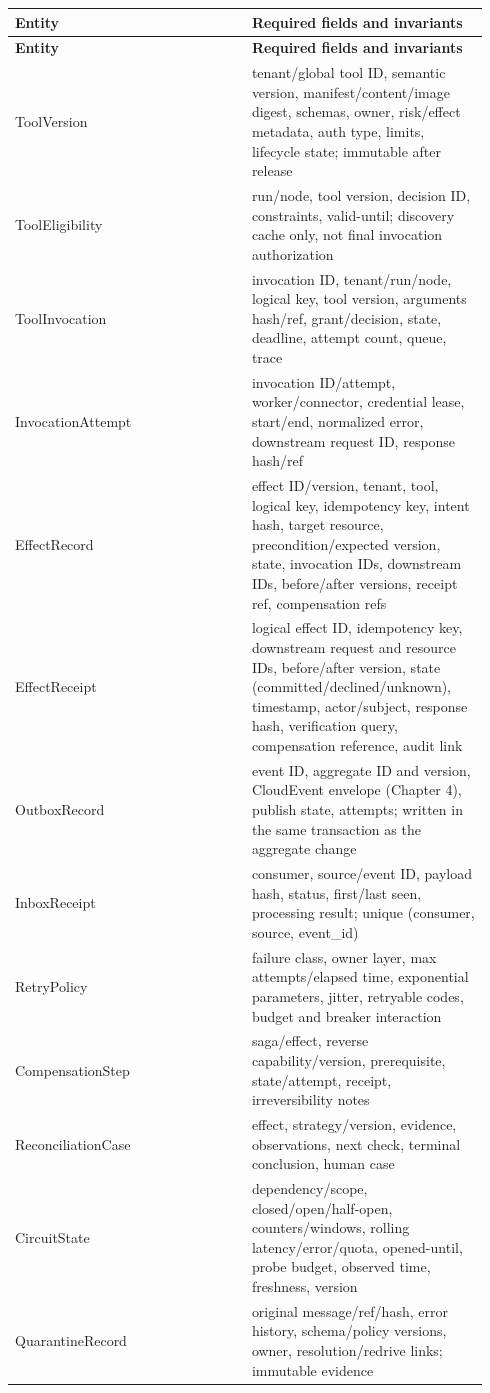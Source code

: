\BookTableStart
\small
\begin{longtable}{@{}Y{0.4700\linewidth}Y{0.4700\linewidth}@{}}
\color{white}\bfseries \textbf{Entity} & \color{white}\bfseries \textbf{Required fields and invariants} \\
\endfirsthead
{}
\color{white}\bfseries \textbf{Entity} & \color{white}\bfseries \textbf{Required fields and invariants} \\
\endhead
ToolVersion & tenant/global tool ID, semantic version, manifest/content/image digest, schemas, owner, risk/effect metadata, auth type, limits, lifecycle state; immutable after release \\
ToolEligibility & run/node, tool version, decision ID, constraints, valid-until; discovery cache only, not final invocation authorization \\
ToolInvocation & invocation ID, tenant/run/node, logical key, tool version, arguments hash/ref, grant/decision, state, deadline, attempt count, queue, trace \\
InvocationAttempt & invocation ID/attempt, worker/connector, credential lease, start/end, normalized error, downstream request ID, response hash/ref \\
EffectRecord & effect ID/version, tenant, tool, logical key, idempotency key, intent hash, target resource, precondition/expected version, state, invocation IDs, downstream IDs, before/after versions, receipt ref, compensation refs \\
EffectReceipt & logical effect ID, idempotency key, downstream request and resource IDs, before/after version, state (committed/declined/unknown), timestamp, actor/subject, response hash, verification query, compensation reference, audit link \\
OutboxRecord & event ID, aggregate ID and version, CloudEvent envelope (Chapter 4), publish state, attempts; written in the same transaction as the aggregate change \\
InboxReceipt & consumer, source/event ID, payload hash, status, first/last seen, processing result; unique (consumer, source, event\_id) \\
RetryPolicy & failure class, owner layer, max attempts/elapsed time, exponential parameters, jitter, retryable codes, budget and breaker interaction \\
CompensationStep & saga/effect, reverse capability/version, prerequisite, state/attempt, receipt, irreversibility notes \\
ReconciliationCase & effect, strategy/version, evidence, observations, next check, terminal conclusion, human case \\
CircuitState & dependency/scope, closed/open/half-open, counters/windows, rolling latency/error/quota, opened-until, probe budget, observed time, freshness, version \\
QuarantineRecord & original message/ref/hash, error history, schema/policy versions, owner, resolution/redrive links; immutable evidence \\
\end{longtable}
\BookTableEnd


